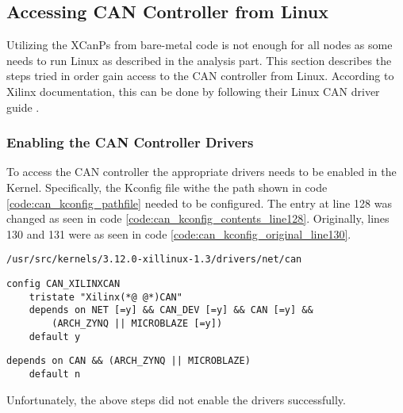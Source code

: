 \subsection{Accessing CAN Controller from Linux}\label{sec:methods_to_implement_can}
Utilizing the XCanPs from bare-metal code is not enough for all nodes as some needs to run Linux as described in the analysis part.
This section describes the steps tried in order gain access to the CAN controller from Linux. 
According to Xilinx documentation, this can be done by following their Linux CAN driver guide \cite{Xilinx_wiki_Linux_CAN_driver}.

\subsubsection*{Enabling the CAN Controller Drivers}
To access the CAN controller the appropriate drivers needs to be enabled in the Kernel.
Specifically, the Kconfig file withe the path shown in code \ref{code:can_kconfig_pathfile} needed to be configured.
The entry at line 128 was changed as seen in code \ref{code:can_kconfig_contents_line128}.
Originally, lines 130 and 131 were as seen in code \ref{code:can_kconfig_original_line130}.

\begin{lstlisting}[caption={CAN Kconfig pathfile.},numbers=none,label=code:can_kconfig_pathfile]
/usr/src/kernels/3.12.0-xillinux-1.3/drivers/net/can
\end{lstlisting}

\begin{lstlisting}[firstnumber=128,caption={Kconfig file contents from line 128.},label={code:can_kconfig_contents_line128}]
config CAN_XILINXCAN
	tristate "Xilinx(*@ @*)CAN"
	depends on NET [=y] && CAN_DEV [=y] && CAN [=y] && 
        (ARCH_ZYNQ || MICROBLAZE [=y])
	default y
\end{lstlisting}

\begin{lstlisting}[firstnumber=130,caption={Original content of lines 130 and 131.},label={code:can_kconfig_original_line130}]
	depends on CAN && (ARCH_ZYNQ || MICROBLAZE)
	default n
\end{lstlisting}

Unfortunately, the above steps did not enable the drivers successfully.

